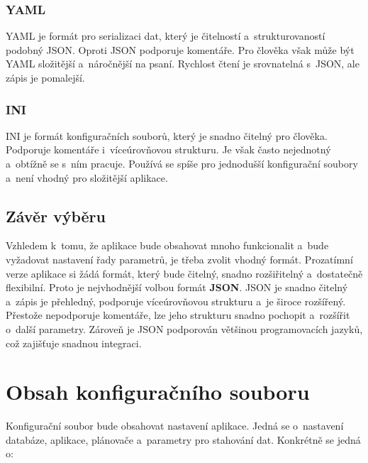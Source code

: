 \subsubsection*{YAML}
\cite{cisco_xml_json_yaml}
YAML je formát pro serializaci dat, který je čitelností a~strukturovaností podobný JSON.
Oproti JSON podporuje komentáře.
Pro člověka však může být YAML složitější a~náročnější na psaní.
Rychlost čtení je srovnatelná s~JSON, ale zápis je pomalejší.

\subsubsection*{INI}
INI je formát konfiguračních souborů, který je snadno čitelný pro člověka.
Podporuje komentáře i~víceúrovňovou strukturu.
Je však často nejednotný a~obtížně se s~ním pracuje.
Používá se spíše pro jednodušší konfigurační soubory a~není vhodný pro složitější aplikace.

\subsection{Závěr výběru}
Vzhledem k~tomu, že aplikace bude obsahovat mnoho funkcionalit a~bude vyžadovat nastavení řady parametrů, je třeba zvolit vhodný formát.
Prozatímní verze aplikace si žádá formát, který bude čitelný, snadno rozšiřitelný a~dostatečně flexibilní.
Proto je nejvhodnější volbou formát \textbf{JSON}.
JSON je snadno čitelný a~zápis je přehledný, podporuje víceúrovňovou strukturu a~je široce rozšířený.
Přestože nepodporuje komentáře, lze jeho strukturu snadno pochopit a~rozšířit o~další parametry.
Zároveň je JSON podporován většinou programovacích jazyků, což zajišťuje snadnou integraci.

\section{Obsah konfiguračního souboru}
Konfigurační soubor bude obsahovat nastavení aplikace.
Jedná se o~nastavení databáze, aplikace, plánovače a~parametry pro stahování dat.
Konkrétně se jedná o:

